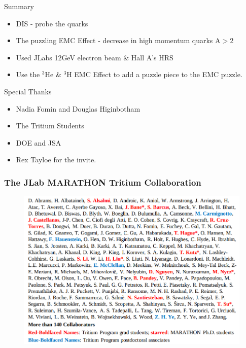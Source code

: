 \documentclass[12pt,usenames,dvipsnames]{beamer}
\begin{document}
\begin{frame}{}
\begin{block}{Summary}
	\begin{itemize}
		\item DIS - probe the quarks 
		\item \small{ The puzzling EMC Effect - decrease in high momentum quarks A$>$2}
		\item Used JLabs 12GeV electron beam \& Hall A's HRS
		\item \small{Use the $^3$He \& $^3$H EMC Effect to add a puzzle piece to the EMC puzzle. }
	\end{itemize}
\end{block}


\begin{block}{Special Thanks}
	\begin{itemize}
		\item Nadia Fomin and Douglas Higinbotham
		\item The Tritium Students 
		\item DOE and JSA 
		\item Rex Tayloe for the invite.
	\end{itemize}
\end{block}
\end{frame}



\begin{frame}
\frametitle{The JLab MARATHON Tritium Collaboration}
\vspace{-15pt}

\begin{figure}
	\includegraphics[width =11.5cm]{../images/collabos_ppl.png}
\end{figure}

\end{frame}
\end{document}
